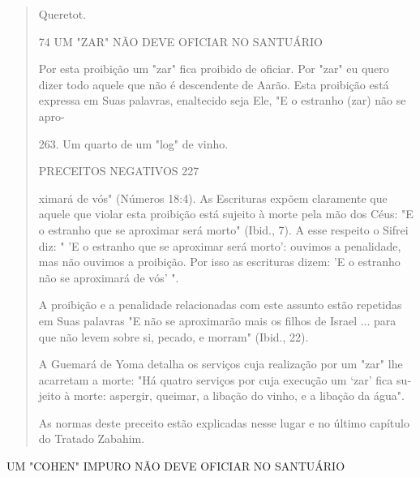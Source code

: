 \begin{quote}
Queretot.

74 UM "ZAR" NÃO DEVE OFICIAR NO SANTUÁRIO

Por esta proibição um "zar" fica proibido de oficiar. Por "zar" eu quero
dizer todo aquele que não é descendente de Aarão. Esta proibição está
expressa em Suas palavras, enaltecido seja Ele, "E o estranho (zar) não
se apro-

263. Um quarto de um "log" de vinho.

PRECEITOS NEGATIVOS 227

ximará de vós" (Números 18:4). As Escrituras expõem claramente que
aquele que violar esta proibição está sujeito à morte pela mão dos Céus:
"E o estranho que se aproximar será morto" (Ibid., 7). A esse respeito o
Sifrei diz: " 'E o es­tranho que se aproximar será morto': ouvimos a
penalidade, mas não ouvimos a proibição. Por isso as escrituras dizem:
'E o estranho não se aproximará de vós' ".

A proibição e a penalidade relacionadas com este assunto estão
re­petidas em Suas palavras "E não se aproximarão mais os filhos de
Israel ... para que não levem sobre si, pecado, e morram" (Ibid., 22).

A Guemará de Yoma detalha os serviços cuja realização por um "zar" lhe
acarretam a morte: "Há quatro serviços por cuja execução um `zar' fica
su­jeito à morte: aspergir, queimar, a libação do vinho, e a libação da
água".

As normas deste preceito estão explicadas nesse lugar e no último
capítulo do Tratado Zabahim.
\end{quote}

UM "COHEN" IMPURO NÃO DEVE OFICIAR NO SANTUÁRIO

